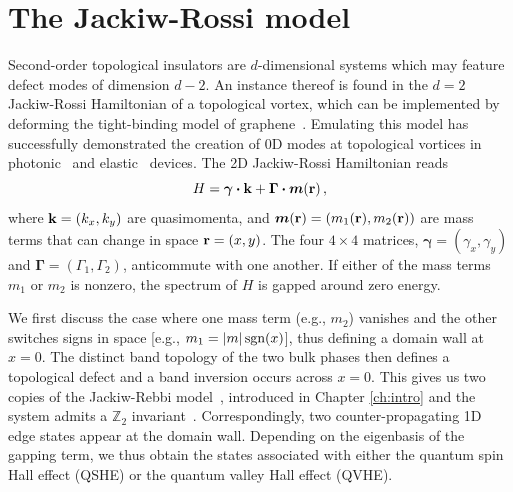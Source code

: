 \section{The Jackiw-Rossi model} 
Second-order topological insulators are $d$-dimensional systems which may feature defect modes of dimension $d-2$. 
An instance thereof is found in the $d=2$ Jackiw-Rossi Hamiltonian of a topological vortex, which can be implemented by deforming the tight-binding model of graphene~\cite{Hou_2007}. Emulating this model has successfully demonstrated the creation of 0D modes at topological vortices in photonic~\cite{Gao_2019, Gao_2020,  Yang_2020} and elastic~\cite{Xiaoxiao_2021} devices. The 2D Jackiw-Rossi Hamiltonian reads
\begin{equation} \label{eq:hoti_H}
H = \boldsymbol{\gamma} \vdot \vb{k} + \boldsymbol{\Gamma} \vdot \boldsymbol{m}(\vb{r})\,,
\end{equation}
where $\vb{k} = (k_x, k_y)$ are quasimomenta, and $\boldsymbol{m}(\vb{r})=(m_1(\vb{r}),m_2(\vb{r}))$ are mass terms that can change in space $\vb{r}=(x,y)$. The four $4 \times 4$ matrices, $\boldsymbol{\gamma} = (\gamma_x, \gamma_y)$ and $\boldsymbol{\Gamma} = (\Gamma_1, \Gamma_2)$, anticommute with one another.
If either of the mass terms $m_1$ or $m_2$ is nonzero, the spectrum of $H$ is gapped around zero energy.

We first discuss the case where one mass term (e.g., $m_2$) vanishes and the other switches signs in space [e.g., $m_1 = \abs{m}\, \text{sgn}(x)$], thus defining a domain wall at $x=0$. The distinct band topology of the two bulk phases then defines a topological defect and a band inversion occurs across $x=0$. This gives us two copies of the Jackiw-Rebbi model~\cite{Jackiw_1976, Wu_Hu_2015}, introduced in Chapter \ref{ch:intro} and the system admits a $\mathbb{Z}_2$ invariant~\cite{Kane_2005b, Qi_2008}. Correspondingly, two counter-propagating 1D edge states appear at the domain wall. Depending on the eigenbasis of the gapping term, we thus obtain the states associated with either the quantum spin Hall effect (QSHE) or the quantum valley Hall effect (QVHE).

